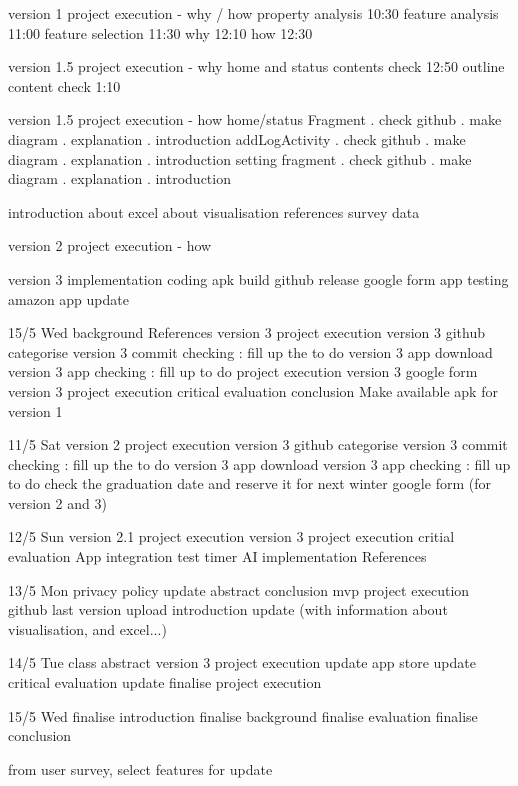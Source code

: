 version 1 project execution - why / how
    property analysis 10:30
    feature analysis 11:00
    feature selection 11:30
    why 12:10
    how 12:30

version 1.5 project execution - why 
    home and status contents check 12:50
    outline content check 1:10
    
version 1.5 project execution - how
    home/status Fragment
        \1. check github 
        \2. make diagram
        \3. explanation
        \4. introduction
    addLogActivity
        \1. check github 
        \2. make diagram
        \3. explanation
        \4. introduction
    setting fragment
        \1. check github 
        \2. make diagram
        \3. explanation
        \4. introduction

introduction
    about excel
    about visualisation
    references
    survey data

version 2 project execution - how

version 3 implementation
    coding 
    apk build
    github release
    google form
    app testing
    amazon app update



15/5 Wed
background 
References
version 3 project execution
version 3 github categorise 
version 3 commit checking : fill up the to do
version 3 app download 
version 3 app checking : fill up to do
project execution version 3
google form version 3
project execution
critical evaluation
conclusion
Make available apk for version 1


11/5 Sat
version 2 project execution
version 3 github categorise 
version 3 commit checking : fill up the to do
version 3 app download 
version 3 app checking : fill up to do
check the graduation date and reserve it for next winter
google form (for version 2 and 3)


12/5 Sun
version 2.1 project execution
version 3 project execution
critial evaluation
App integration test
timer
AI implementation
References


13/5 Mon
privacy policy update
abstract
conclusion
mvp project execution
github last version upload
introduction update (with information about visualisation, and excel...)


14/5 Tue
class abstract
version 3 project execution update
app store update
critical evaluation update
finalise project execution

15/5 Wed
finalise introduction
finalise background
finalise evaluation
finalise conclusion



from user survey, select features for update
